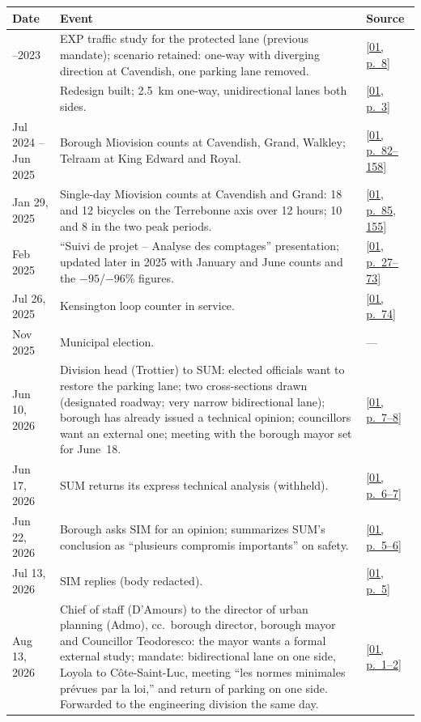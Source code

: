 \documentclass[11pt,letterpaper]{article}
\newcommand{\pagesurl}{https://openmobilitydata.github.io/Terrebonne-access-requests}
\newcommand{\pgl}[3]{\href{\pagesurl/\csname bundle#1\endcsname\#page=#2}{\textsf{\small[#1, p.~#3]}}}
\newcommand{\pg}[2]{\pgl{#1}{#2}{#2}}
\begin{document}
\begin{small}
\begin{longtable}{>{\raggedright\arraybackslash}p{2.6cm}>{\raggedright\arraybackslash}p{10.2cm}>{\raggedright\arraybackslash}p{2.0cm}}
\toprule
Date & Event & Source \\
\midrule
\endhead
2022--2023 & EXP traffic study for the protected lane (previous mandate); scenario retained: one-way with diverging direction at Cavendish, one parking lane removed. & \pg{01}{8} \\
2024 & Redesign built; 2.5~km one-way, unidirectional lanes both sides. & \pg{01}{3} \\
Jul 2024 -- Jun 2025 & Borough Miovision counts at Cavendish, Grand, Walkley; Telraam at King Edward and Royal. & \pgl{01}{82}{82--158} \\
Jan 29, 2025 & Single-day Miovision counts at Cavendish and Grand: 18 and 12 bicycles on the Terrebonne axis over 12 hours; 10 and 8 in the two peak periods. & \pgl{01}{85}{85, 155} \\
Feb 2025 & ``Suivi de projet -- Analyse des comptages'' presentation; updated later in 2025 with January and June counts and the $-95$/$-96$\% figures. & \pgl{01}{27}{27--73} \\
Jul 26, 2025 & Kensington loop counter in service. & \pg{01}{74} \\
Nov 2025 & Municipal election. & --- \\
Jun 10, 2026 & Division head (Trottier) to SUM: elected officials want to restore the parking lane; two cross-sections drawn (designated roadway; very narrow bidirectional lane); borough has already issued a technical opinion; councillors want an external one; meeting with the borough mayor set for June~18. & \pgl{01}{7}{7--8} \\
Jun 17, 2026 & SUM returns its express technical analysis (withheld). & \pgl{01}{6}{6--7} \\
Jun 22, 2026 & Borough asks SIM for an opinion; summarizes SUM's conclusion as ``plusieurs compromis importants'' on safety. & \pgl{01}{5}{5--6} \\
Jul 13, 2026 & SIM replies (body redacted). & \pg{01}{5} \\
Aug 13, 2026 & Chief of staff (D'Amours) to the director of urban planning (Admo), cc.\ borough director, borough mayor and Councillor Teodoresco: the mayor wants a formal external study; mandate: bidirectional lane on one side, Loyola to C\^ote-Saint-Luc, meeting ``les normes minimales pr\'evues par la loi,'' and return of parking on one side. Forwarded to the engineering division the same day. & \pgl{01}{1}{1--2} \\

\end{longtable}
\end{small}
\end{document}
